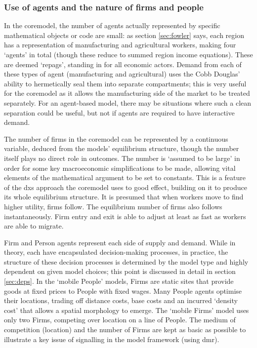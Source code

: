 \subsubsection{Use of agents and the nature of firms and people}

In the \gls{coremodel}, the number of agents actually represented by specific mathematical objects or code are small: as section \ref{sec:fowler} says, each region has a representation of manufacturing and agricultural workers, making four `agents' in total (though these reduce to summed region income  equations). These are deemed `\gls{repag}s', standing in for all economic actors. Demand from each of these types of agent (manufacturing and agricultural) uses the Cobb Douglas' ability to hermetically seal them into separate compartments; this is very useful for the \gls{coremodel} as it allows the manufacturing side of the market to be treated separately. For an agent-based model, there may be situations where such a clean separation could be useful, but not if agents are required to have interactive demand.

The number of firms in the \gls{coremodel} can be represented by a continuous variable, deduced from the models' equilibrium structure, though the number itself plays no direct role in outcomes. The number is `assumed to be large' in order for some key macroeconomic simplifications to be made, allowing vital elements of the mathematical argument to be set to constants. This is a feature of the \gls{dxs} approach the \gls{coremodel} uses to good effect, building on it to produce its whole equilibrium structure. It is presumed that when workers move to find higher utility, firms follow. The equilibrium number of firms also follows instantaneously. Firm entry and exit is able to adjust at least as fast as workers are able to migrate.

Firm and Person agents represent each side of supply and demand. While in theory, each have encapsulated decision-making processes, in practice, the structure of these decision processes is determined by the model type and highly dependent on given model choices; this point is discussed in detail in section \ref{sec:deps}. In the `mobile People' models, Firms are static sites that provide goods at fixed prices to People with fixed wages. Many People agents optimise their locations, trading off distance costs, base costs and an incurred `density cost' that allows a spatial morphology to emerge. The `mobile Firms' model uses only two Firms, competing over location on a line of People. The medium of competition (location) and the number of Firms are kept as basic as possible to illustrate a key issue of signalling in the model framework (using \gls{dmr}).


